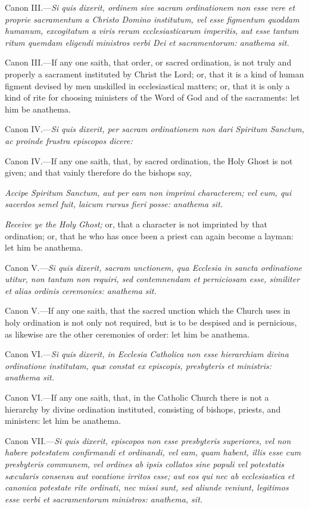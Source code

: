 Canon III.—\emph{Si quis dixerit, ordinem sive sacram ordinationem non esse vere et proprie sacramentum a Christo Domino institutum, vel esse figmentum quoddam humanum, excogitatum a viris rerum ecclesiasticarum imperitis, aut esse tantum ritum quemdam eligendi ministros verbi Dei et sacramentorum: anathema sit.}

Canon III.—If any one saith, that order, or sacred ordination, is not truly and properly a sacrament instituted by Christ the Lord; or, that it is a kind of human figment devised by men unskilled in ecclesiastical matters; or, that it is only a kind of rite for choosing ministers of the Word of God and of the sacraments: let him be anathema.

Canon IV.—\emph{Si quis dixerit, per sacram ordinationem non dari Spiritum Sanctum, ac proinde frustra episcopos dicere: }

Canon IV.—If any one saith, that, by sacred ordination, the Holy Ghost is not given; and that vainly therefore do the bishops say,

\emph{Accipe Spiritum Sanctum, aut per eam non imprimi characterem; vel eum, qui sacerdos semel fuit, laicum rursus fieri posse: anathema sit.}

\emph{Receive ye the Holy Ghost;} or, that a character is not imprinted by that ordination; or, that he who has once been a priest can again become a layman: let him be anathema.

Canon V.—\emph{Si quis dixerit, sacram unctionem, qua Ecclesia in sancta ordinatione utitur, non tantum non requiri, sed contemnendam et perniciosam esse, similiter et alias ordinis ceremonies: anathema sit.}

Canon V.—If any one saith, that the sacred unction which the Church uses in holy ordination is not only not required, but is to be despised and is pernicious, as likewise are the other ceremonies of order: let him be anathema.

Canon VI.—\emph{Si quis dixerit, in Ecclesia Catholica non esse hierarchiam divina ordinatione institutam, quæ constat ex episcopis, presbyteris et ministris: anathema sit.}

Canon VI.—If any one saith, that, in the Catholic Church there is not a hierarchy by divine ordination instituted, consisting of bishops, priests, and ministers: let him be anathema.

Canon VII.—\emph{Si quis dixerit, episcopos non esse presbyteris superiores, vel non habere potestatem confirmandi et ordinandi, vel eam, quam habent, illis esse cum presbyteris communem, vel ordines ab ipsis collatos sine populi vel potestatis sæcularis consensu aut vocatione irritos esse; aut eos qui nec ab ecclesiastica et canonica potestate rite ordinati, nec missi sunt, sed aliunde veniunt, legitimos esse verbi et sacramentorum ministros: anathema, sit.}

